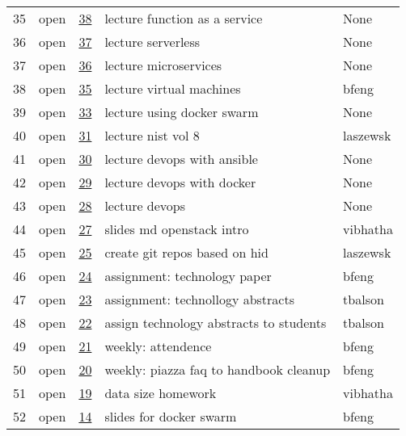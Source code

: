 \begin{center}
\begin{longtable}{lllll}
35 & open & \href{https://github.com/cloudmesh/book/issues/38}{38} & lecture function as a service & None\\
36 & open & \href{https://github.com/cloudmesh/book/issues/37}{37} & lecture serverless & None\\
37 & open & \href{https://github.com/cloudmesh/book/issues/36}{36} & lecture microservices & None\\
38 & open & \href{https://github.com/cloudmesh/book/issues/35}{35} & lecture virtual machines & bfeng\\
39 & open & \href{https://github.com/cloudmesh/book/issues/33}{33} & lecture using docker swarm & None\\
40 & open & \href{https://github.com/cloudmesh/book/issues/31}{31} & lecture nist vol 8 & laszewsk\\
41 & open & \href{https://github.com/cloudmesh/book/issues/30}{30} & lecture devops with ansible & None\\
42 & open & \href{https://github.com/cloudmesh/book/issues/29}{29} & lecture devops with docker & None\\
43 & open & \href{https://github.com/cloudmesh/book/issues/28}{28} & lecture devops & None\\
44 & open & \href{https://github.com/cloudmesh/book/issues/27}{27} & slides md openstack intro & vibhatha\\
45 & open & \href{https://github.com/cloudmesh/book/issues/25}{25} & create git repos based on hid & laszewsk\\
46 & open & \href{https://github.com/cloudmesh/book/issues/24}{24} & assignment: technology paper & bfeng\\
47 & open & \href{https://github.com/cloudmesh/book/issues/23}{23} & assignment: technollogy abstracts & tbalson\\
48 & open & \href{https://github.com/cloudmesh/book/issues/22}{22} & assign technology abstracts to students & tbalson\\
49 & open & \href{https://github.com/cloudmesh/book/issues/21}{21} & weekly: attendence & bfeng\\
50 & open & \href{https://github.com/cloudmesh/book/issues/20}{20} & weekly: piazza faq to handbook cleanup & bfeng\\
51 & open & \href{https://github.com/cloudmesh/book/issues/19}{19} & data size homework & vibhatha\\
52 & open & \href{https://github.com/cloudmesh/book/issues/14}{14} & slides for docker swarm & bfeng\\
\end{longtable}
\end{center}
